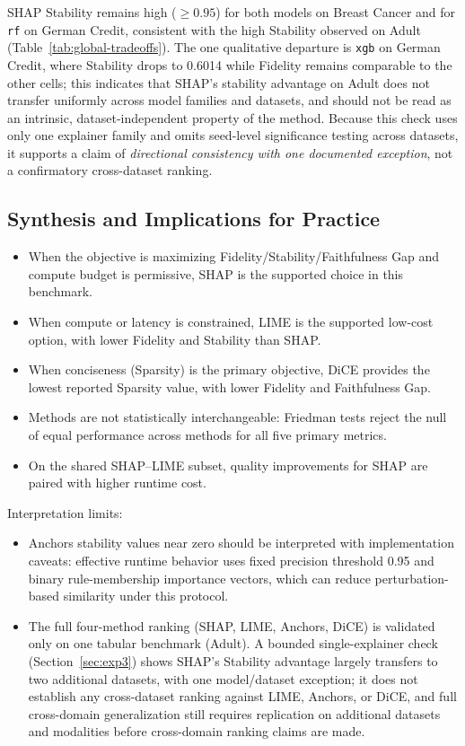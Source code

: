 \documentclass[twoside,11pt]{article}
\begin{document}
SHAP Stability remains high (${\geq}0.95$) for both models on Breast Cancer and
for \texttt{rf} on German Credit, consistent with the high Stability observed
on Adult (Table~\ref{tab:global-tradeoffs}). The one qualitative departure is
\texttt{xgb} on German Credit, where Stability drops to 0.6014 while Fidelity
remains comparable to the other cells; this indicates that SHAP's stability
advantage on Adult does not transfer uniformly across model families and
datasets, and should not be read as an intrinsic, dataset-independent property
of the method. Because this check uses only one explainer family and omits
seed-level significance testing across datasets, it supports a claim of
\emph{directional consistency with one documented exception}, not a
confirmatory cross-dataset ranking.

\subsection{Synthesis and Implications for Practice}
\begin{itemize}[leftmargin=*]
    \item When the objective is maximizing Fidelity/Stability/Faithfulness Gap and compute budget is permissive, SHAP is the supported choice in this benchmark.
    \item When compute or latency is constrained, LIME is the supported low-cost option, with lower Fidelity and Stability than SHAP.
    \item When conciseness (Sparsity) is the primary objective, DiCE provides the lowest reported Sparsity value, with lower Fidelity and Faithfulness Gap.
    \item Methods are not statistically interchangeable: Friedman tests reject the null of equal performance across methods for all five primary metrics.
    \item On the shared SHAP--LIME subset, quality improvements for SHAP are paired with higher runtime cost.
\end{itemize}
Interpretation limits:
\begin{itemize}[leftmargin=*]
    \item Anchors stability values near zero should be interpreted with implementation caveats: effective runtime behavior uses fixed precision threshold 0.95 and binary rule-membership importance vectors, which can reduce perturbation-based similarity under this protocol.
    \item The full four-method ranking (SHAP, LIME, Anchors, DiCE) is validated only on one tabular benchmark (Adult). A bounded single-explainer check (Section~\ref{sec:exp3}) shows SHAP's Stability advantage largely transfers to two additional datasets, with one model/dataset exception; it does not establish any cross-dataset ranking against LIME, Anchors, or DiCE, and full cross-domain generalization still requires replication on additional datasets and modalities before cross-domain ranking claims are made.
\end{itemize}
\end{document}
